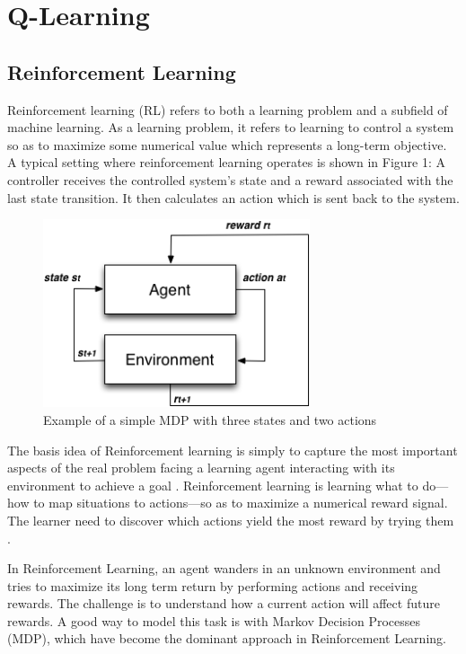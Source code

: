 \chapter{Q-Learning}




\section{Reinforcement Learning}

Reinforcement learning (RL) refers to both a learning problem and a subfield of machine
learning. As a learning problem, it refers to learning to control a system so as to maximize
some numerical value which represents a long-term objective. A typical setting where
reinforcement learning operates is shown in Figure 1: A controller receives the controlled
system’s state and a reward associated with the last state transition. It then calculates an
action which is sent back to the system.


\begin{figure}
\centering
\includegraphics[width=0.7\textwidth]{./images/agentenv.png}
\caption{Example of a simple MDP with three states and two actions}
\label{fig:agentenv}
\end{figure}


The basis idea of Reinforcement learning  is simply to capture the most important aspects of the real problem facing a learning agent interacting with its environment to achieve a goal \cite{Sutton2012}. Reinforcement learning is learning what to do—how to map situations to actions—so as to maximize a numerical reward signal. The learner need to discover which actions yield the most reward by trying them \cite{Sutton2012}.

In Reinforcement Learning, an agent wanders in an unknown environment and tries to maximize its long term return by performing actions and receiving rewards. The challenge is to understand how a current action will affect future rewards. A good way to model this task is with Markov Decision Processes (MDP), which have become the dominant approach in Reinforcement Learning.

